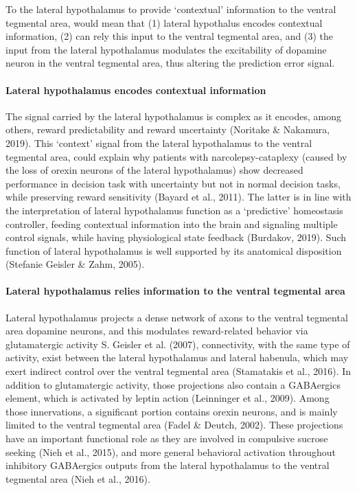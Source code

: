\documentclass[
]{/home/nicoluarte/Downloads/templates/PNAS-template-main.tex}
\begin{document}
To the lateral hypothalamus to provide `contextual' information to the
ventral tegmental area, would mean that (1) lateral hypothalus encodes
contextual information, (2) can rely this input to the ventral tegmental
area, and (3) the input from the lateral hypothalamus modulates the
excitability of dopamine neuron in the ventral tegmental area, thus
altering the prediction error signal.

\hypertarget{lateral-hypothalamus-encodes-contextual-information}{%
\paragraph{Lateral hypothalamus encodes contextual
information}\label{lateral-hypothalamus-encodes-contextual-information}}

The signal carried by the lateral hypothalamus is complex as it encodes,
among others, reward predictability and reward uncertainty (Noritake \&
Nakamura, 2019). This `context' signal from the lateral hypothalamus to
the ventral tegmental area, could explain why patients with
narcolepsy-cataplexy (caused by the loss of orexin neurons of the
lateral hypothalamus) show decreased performance in decision task with
uncertainty but not in normal decision tasks, while preserving reward
sensitivity (Bayard et al., 2011). The latter is in line with the
interpretation of lateral hypothalamus function as a `predictive'
homeostasis controller, feeding contextual information into the brain
and signaling multiple control signals, while having physiological state
feedback (Burdakov, 2019). Such function of lateral hypothalamus is well
supported by its anatomical disposition (Stefanie Geisler \& Zahm,
2005).

\hypertarget{lateral-hypothalamus-relies-information-to-the-ventral-tegmental-area}{%
\paragraph{Lateral hypothalamus relies information to the ventral
tegmental
area}\label{lateral-hypothalamus-relies-information-to-the-ventral-tegmental-area}}

Lateral hypothalamus projects a dense network of axons to the ventral
tegmental area dopamine neurons, and this modulates reward-related
behavior via glutamatergic activity S. Geisler et al. (2007),
connectivity, with the same type of activity, exist between the lateral
hypothalamus and lateral habenula, which may exert indirect control over
the ventral tegmental area (Stamatakis et al., 2016). In addition to
glutamatergic activity, those projections also contain a GABAergics
element, which is activated by leptin action (Leinninger et al., 2009).
Among those innervations, a significant portion contains orexin neurons,
and is mainly limited to the ventral tegmental area (Fadel \& Deutch,
2002). These projections have an important functional role as they are
involved in compulsive sucrose seeking (Nieh et al., 2015), and more
general behavioral activation throughout inhibitory GABAergics outputs
from the lateral hypothalamus to the ventral tegmental area (Nieh et
al., 2016).
\end{document}
